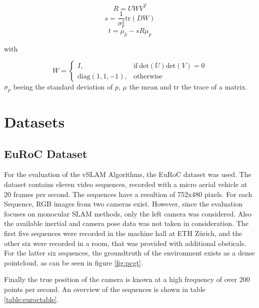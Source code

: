 	$$ R = UWV^T $$
	$$ s = \frac{1}{\sigma^2_p}\text{tr}\left(DW\right)$$
	$$ t = \mu_{\widehat{p}} - sR\mu_p $$
	
	with 
	
	$$ W = \begin{cases}
      I, & \text{if}\ \text{det}\left(U\right)\text{det}\left(V\right) =0 \\
      \text{diag}\left(1,1,-1\right), & \text{otherwise}
    \end{cases}$$
	$\sigma_p$ beeing the standard deviation of $p$, $\mu$ the mean and $\text{tr}$ the trace of a matrix. 
	

\section{Datasets}

	\subsection{EuRoC Dataset}

	For the evaluation of the vSLAM Algorithms, the EuRoC dataset \cite{euroc} was used.
	The dataset contains eleven video sequences, recorded with a micro aerial vehicle at 20 frames per second.
	The sequences have a resultion of 752x480 pixels.
	For each Sequence, RGB images from two cameras exist. However, since the evaluation
	focuses on monocular SLAM methods, only the left camera was considered. Also the available 
	inertial and camera pose data was not taken in consideration. The first five sequences were recorded in 
	the machine hall at ETH Zürich, and the other six were recorded in a room, that was provided 
	with additional obsticals. For the latter six sequences, the groundtruth of the environment 
	exists as a dense pointcloud, as can be seen in figure \ref{fig:pcgt}.


	Finally the true position of the 
	camera is known at a high frequency of over 200 points per second. 
	An overview of the sequences is shown in table \ref{table:euroctable}.



